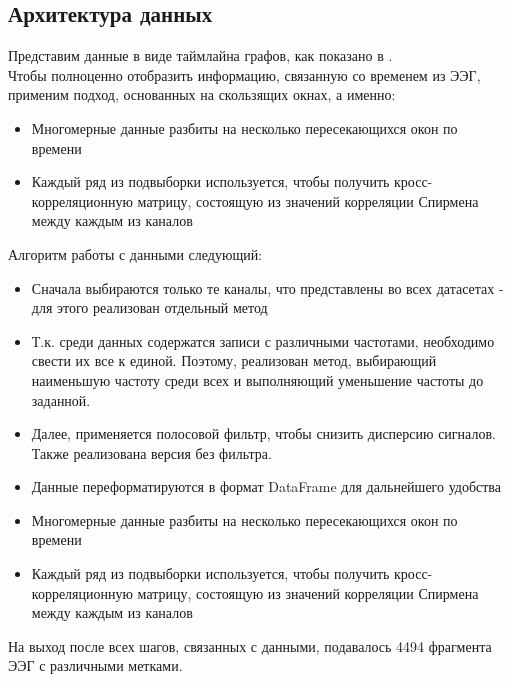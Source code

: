 \documentclass[12pt, a4paper, titlepage]{extreport}
\begin{document}
	\subsection*{Архитектура данных}
	Представим данные в виде таймлайна графов, как показано в \cite{29}.\\
	Чтобы полноценно отобразить информацию, связанную со временем из ЭЭГ, применим подход, основанных на скользящих окнах, а именно:
	\begin{itemize}
		\item Многомерные данные разбиты на несколько пересекающихся окон по времени
		\item Каждый ряд из подвыборки используется, чтобы получить кросс-корреляционную матрицу, состоящую из значений корреляции Спирмена между каждым из каналов
	\end{itemize}
	Алгоритм работы с данными следующий:
		\begin{itemize}
		\item Сначала выбираются только те каналы, что представлены во всех датасетах - для этого реализован отдельный метод 
		\item Т.к. среди данных содержатся записи с различными частотами, необходимо свести их все к единой. Поэтому, реализован метод, выбирающий наименьшую частоту среди всех и выполняющий уменьшение частоты до заданной.
		\item Далее, применяется полосовой фильтр, чтобы снизить дисперсию сигналов. Также реализована версия без фильтра.
		\item Данные переформатируются в формат DataFrame для дальнейшего удобства
		\item Многомерные данные разбиты на несколько пересекающихся окон по времени
		\item Каждый ряд из подвыборки используется, чтобы получить кросс-корреляционную матрицу, состоящую из значений корреляции Спирмена между каждым из каналов
	\end{itemize}
	На выход после всех шагов, связанных с данными, подавалось 4494 фрагмента ЭЭГ с различными метками.
\end{document}
